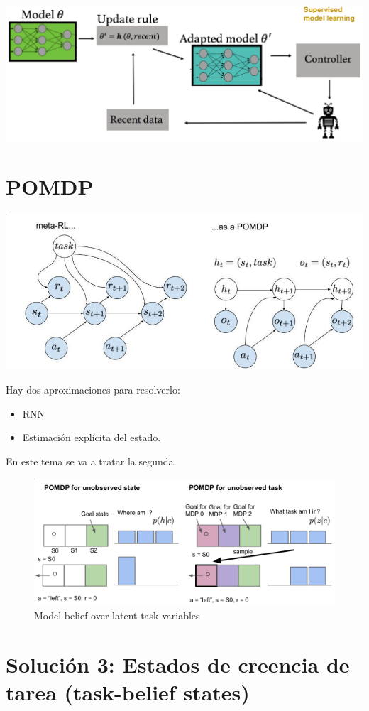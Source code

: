 \begin{center}
\includegraphics[width=.6\textwidth]{figures/2020-07-25-185920_1017x385_scrot.png}
\end{center}

\section{POMDP}%
\label{sec:pomdp}

\begin{center}
\includegraphics[width=.7\textwidth]{figures/2020-07-25-191537_980x428_scrot.png}
\end{center}

Hay dos aproximaciones para resolverlo:
\begin{itemize}
    \item RNN
    \item Estimación explícita del estado.
\end{itemize}
En este tema se va a tratar la segunda.

\begin{figure}
    \center
\includegraphics[width=.6\textwidth]{figures/2020-07-25-192831_1012x428_scrot.png}
\caption{Model belief over latent task variables}
\end{figure}

\section{Solución 3: Estados de creencia de tarea (task-belief states)}%
\label{sec:solución_3_estados_de_creencia_de_tarea_task_belief_states_}

